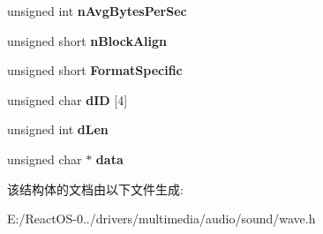 \begin{DoxyCompactItemize}
unsigned int {\bfseries n\+Avg\+Bytes\+Per\+Sec}
\item 
\mbox{\label{struct_w_a_v_e___h_d_r_a22bba8d4df744b35749eb9787abe6b27}} 
unsigned short {\bfseries n\+Block\+Align}
\item 
\mbox{\label{struct_w_a_v_e___h_d_r_a3106afadce7ebe920921702e925fd4d7}} 
unsigned short {\bfseries Format\+Specific}
\item 
\mbox{\label{struct_w_a_v_e___h_d_r_a7687600adb403327f70c19a7c9c6d9a8}} 
unsigned char {\bfseries d\+ID} \mbox{[}4\mbox{]}
\item 
\mbox{\label{struct_w_a_v_e___h_d_r_a96fab9c1faef7dd949c23703108d99b3}} 
unsigned int {\bfseries d\+Len}
\item 
\mbox{\label{struct_w_a_v_e___h_d_r_a837d605a536689de016a47bf679d79aa}} 
unsigned char $\ast$ {\bfseries data}
\end{DoxyCompactItemize}


该结构体的文档由以下文件生成\+:\begin{DoxyCompactItemize}
\item 
E\+:/\+React\+O\+S-\/0../drivers/multimedia/audio/sound/wave.\+h\end{DoxyCompactItemize}
